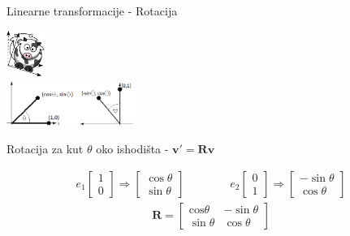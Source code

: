 \documentclass[9pt]{beamer}
\begin{document}
\begin{frame}{Linearne transformacije  - Rotacija}
	\begin{center}
		\includegraphics[height=1.5cm]{slike/funny_cow_rotate.png} \\
		\includegraphics[height=1.5cm]{slike/basis_vector_rotation.png}
	\end{center}
	Rotacija za kut $\theta$ oko ishodišta - $\mathbf{v}' = \mathbf{R}\mathbf{v}$
	
		\begin{align*}
		e_{1} \left[ \begin{array}{c} 1 \\ 0  \end{array} \right] \Rightarrow
		\left[ \begin{array}{c} \cos\theta \\ \sin \theta  \end{array} \right]
		\qquad\qquad
		e_{2} \left[ \begin{array}{c} 0 \\ 1  \end{array} \right] \Rightarrow
		\left[ \begin{array}{c} -\sin\theta \\ \cos\theta  \end{array} \right]  
		\end{align*}
		\begin{align*}
		\mathbf{R} =  \left[ \begin{array}{cc} \mathrm{cos}\theta & -\sin\theta \\ 
		\sin\theta & \cos\theta  \end{array} \right]
		\nonumber
		\end{align*}
\end{frame}
\end{document}
